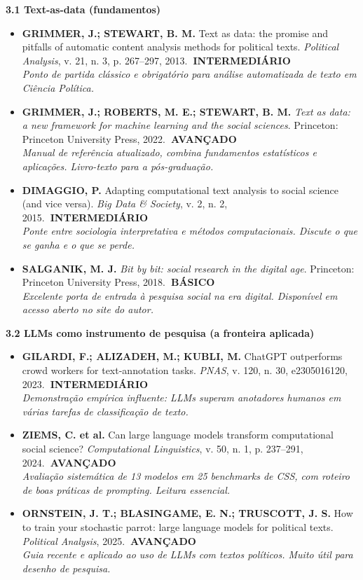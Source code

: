 \documentclass[11pt,a4paper]{article}
\newcommand{\refc}[2]{\item #1\\{\footnotesize\color{cinzaescuro}\textit{#2}}}
\newcommand{\nivelbasico}{\hfill\colorbox{verdeCodigo}{\color{white}\scriptsize\poppinsmed\textbf{~BÁSICO~}}}
\newcommand{\nivelinterm}{\hfill\colorbox{amareloSol}{\color{black}\scriptsize\poppinsmed\textbf{~INTERMEDIÁRIO~}}}
\newcommand{\nivelavancado}{\hfill\colorbox{laranjaDestaque}{\color{white}\scriptsize\poppinsmed\textbf{~AVANÇADO~}}}
\begin{document}
\textbf{\poppinsmed\color{azulUNIclaro}3.1 Text-as-data (fundamentos)}
\begin{itemize}[leftmargin=1.4em,label={}]
\refc{\textbf{GRIMMER, J.; STEWART, B. M.} Text as data: the promise and pitfalls of automatic content analysis methods for political texts. \textit{Political Analysis}, v. 21, n. 3, p. 267--297, 2013.\nivelinterm}{Ponto de partida clássico e obrigatório para análise automatizada de texto em Ciência Política.}
\refc{\textbf{GRIMMER, J.; ROBERTS, M. E.; STEWART, B. M.} \textit{Text as data: a new framework for machine learning and the social sciences}. Princeton: Princeton University Press, 2022.\nivelavancado}{Manual de referência atualizado, combina fundamentos estatísticos e aplicações. Livro-texto para a pós-graduação.}
\refc{\textbf{DIMAGGIO, P.} Adapting computational text analysis to social science (and vice versa). \textit{Big Data \& Society}, v. 2, n. 2, 2015.\nivelinterm}{Ponte entre sociologia interpretativa e métodos computacionais. Discute o que se ganha e o que se perde.}
\refc{\textbf{SALGANIK, M. J.} \textit{Bit by bit: social research in the digital age}. Princeton: Princeton University Press, 2018.\nivelbasico}{Excelente porta de entrada à pesquisa social na era digital. Disponível em acesso aberto no site do autor.}
\end{itemize}

\textbf{\poppinsmed\color{azulUNIclaro}3.2 LLMs como instrumento de pesquisa (a fronteira aplicada)}
\begin{itemize}[leftmargin=1.4em,label={}]
\refc{\textbf{GILARDI, F.; ALIZADEH, M.; KUBLI, M.} ChatGPT outperforms crowd workers for text-annotation tasks. \textit{PNAS}, v. 120, n. 30, e2305016120, 2023.\nivelinterm}{Demonstração empírica influente: LLMs superam anotadores humanos em várias tarefas de classificação de texto.}
\refc{\textbf{ZIEMS, C. et al.} Can large language models transform computational social science? \textit{Computational Linguistics}, v. 50, n. 1, p. 237--291, 2024.\nivelavancado}{Avaliação sistemática de 13 modelos em 25 \textit{benchmarks} de CSS, com roteiro de boas práticas de prompting. Leitura essencial.}
\refc{\textbf{ORNSTEIN, J. T.; BLASINGAME, E. N.; TRUSCOTT, J. S.} How to train your stochastic parrot: large language models for political texts. \textit{Political Analysis}, 2025.\nivelavancado}{Guia recente e aplicado ao uso de LLMs com textos políticos. Muito útil para desenho de pesquisa.}
\end{itemize}
\end{document}

